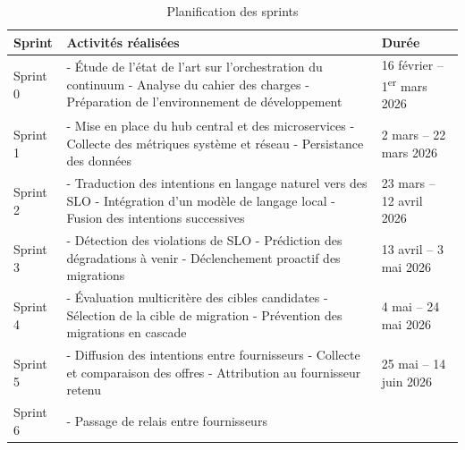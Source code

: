 \begin{table}[H]
    \centering
    \caption{Planification des sprints}
    \label{tab:sprints}
    \begin{tabular}{p{2cm}p{8.5cm}p{3.5cm}}
        \toprule
        \textbf{Sprint} & \textbf{Activités réalisées} & \textbf{Durée} \\
        \midrule
        Sprint 0 &
        - Étude de l'état de l'art sur l'orchestration du continuum \newline
        - Analyse du cahier des charges \newline
        - Préparation de l'environnement de développement &
        16 février -- 1\textsuperscript{er} mars 2026 \\
        \midrule
        Sprint 1 &
        - Mise en place du hub central et des microservices \newline
        - Collecte des métriques système et réseau \newline
        - Persistance des données &
        2 mars -- 22 mars 2026 \\
        \midrule
        Sprint 2 &
        - Traduction des intentions en langage naturel vers des SLO \newline
        - Intégration d'un modèle de langage local \newline
        - Fusion des intentions successives &
        23 mars -- 12 avril 2026 \\
        \midrule
        Sprint 3 &
        - Détection des violations de SLO \newline
        - Prédiction des dégradations à venir \newline
        - Déclenchement proactif des migrations &
        13 avril -- 3 mai 2026 \\
        \midrule
        Sprint 4 &
        - Évaluation multicritère des cibles candidates \newline
        - Sélection de la cible de migration \newline
        - Prévention des migrations en cascade &
        4 mai -- 24 mai 2026 \\
        \midrule
        Sprint 5 &
        - Diffusion des intentions entre fournisseurs \newline
        - Collecte et comparaison des offres \newline
        - Attribution au fournisseur retenu &
        25 mai -- 14 juin 2026 \\
        \midrule
        Sprint 6 &
        - Passage de relais entre fournisseurs \newline

\end{tabular}
\end{table}
